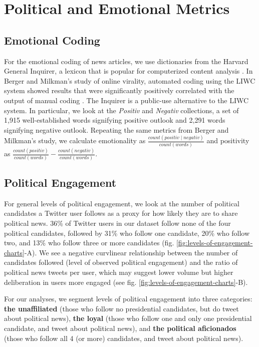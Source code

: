 \documentclass[letterpaper]{article}
\begin{document}
\section{Political and Emotional Metrics}
\subsection{Emotional Coding}
For the emotional coding of news articles, we use dictionaries from the Harvard General Inquirer, a lexicon that is popular for computerized content analysis \cite{stone1963computer}. In Berger and Milkman's study of online virality, automated coding using the LIWC system showed results that were significantly positively correlated with the output of manual coding \cite{berger2012makes}. The Inquirer is a public-use alternative to the LIWC system. In particular, we look at the \emph{Positiv} and \emph{Negativ} collections, a set of 1,915 well-established words signifying positive outlook and 2,291 words signifying negative outlook. Repeating the same metrics from Berger and Milkman's study, we calculate emotionality as $\frac{count(positiv \mid negativ)}{count(words)}$ and positivity as $\frac{count(positiv)}{count(words)} - \frac{count(negativ)}{count(words)}$.

\subsection{Political Engagement}  
For general levels of political engagement, we look at the number of political candidates a Twitter user follows as a proxy for how likely they are to share political news. 36\% of Twitter users in our dataset follow none of the four political candidates, followed by 31\% who follow one candidate, 20\% who follow two, and 13\% who follow three or more candidates (fig. \ref{fig:levels-of-engagement-charts}-A). We see a negative curvlinear relationship between the number of candidates followed (level of observed political engagement) and the ratio of political news tweets per user, which may suggest lower volume but higher deliberation in users more engaged (see fig. \ref{fig:levels-of-engagement-charts}-B).

For our analyses, we segment levels of political engagement into three categories: \textbf{the unaffiliated} (those who follow no presidential candidates, but do tweet about political news), \textbf{the loyal} (those who follow one and only one presidential candidate, and tweet about political news), and \textbf{the political aficionados} (those who follow all 4 (or more) candidates, and tweet about political news).  
\end{document}
